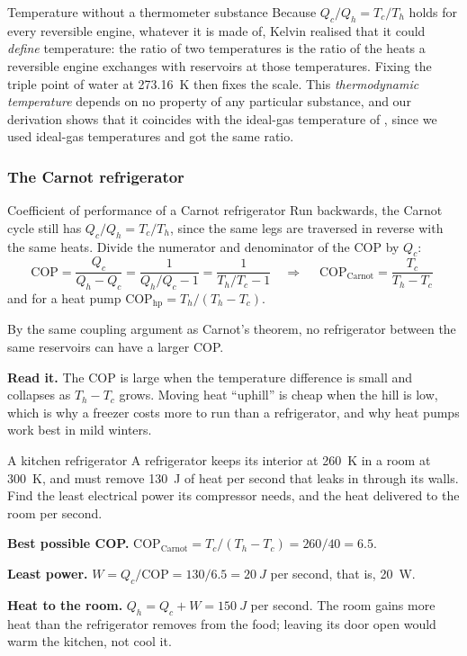 \begin{remarkbox}{Temperature without a thermometer substance}
Because $Q_c/Q_h=T_c/T_h$ holds for every reversible engine, whatever it is made of, Kelvin realised
that it could \emph{define} temperature: the ratio of two temperatures is the ratio of the heats a
reversible engine exchanges with reservoirs at those temperatures. Fixing the triple point of water at
\SI{273.16}{K} then fixes the scale. This \emph{thermodynamic temperature} depends on no property of any
particular substance, and our derivation shows that it coincides with the ideal-gas temperature of
, since we used ideal-gas temperatures and got the same ratio.
\end{remarkbox}

\subsubsection{The Carnot refrigerator}

\begin{derivbox}{Coefficient of performance of a Carnot refrigerator}\label{der:carnot-cop}
 Run backwards, the Carnot cycle still has $Q_c/Q_h=T_c/T_h$, since the same legs are traversed in
reverse with the same heats. Divide the numerator and denominator of the COP by $Q_c$:
\[
\text{COP}=\frac{Q_c}{Q_h-Q_c}=\frac{1}{Q_h/Q_c-1}=\frac{1}{T_h/T_c-1}
\quad\Longrightarrow\quad
\boxed{\;\text{COP}_{\text{Carnot}}=\frac{T_c}{T_h-T_c}\;}
\]
and for a heat pump $\text{COP}_{\text{hp}}=T_h/(T_h-T_c)$.

 By the same coupling argument as Carnot's theorem, no refrigerator between the same reservoirs
can have a larger COP.

 \textbf{Read it.} The COP is large when the temperature difference is small and collapses as
$T_h-T_c$ grows. Moving heat ``uphill'' is cheap when the hill is low, which is why a freezer costs more to
run than a refrigerator, and why heat pumps work best in mild winters.
\end{derivbox}

\begin{exbox}{A kitchen refrigerator}\label{ex:thermo-fridge}
A refrigerator keeps its interior at \SI{260}{K} in a room at \SI{300}{K}, and must remove \SI{130}{J} of
heat per second that leaks in through its walls. Find the least electrical power its compressor needs, and
the heat delivered to the room per second.

 \textbf{Best possible COP.} $\text{COP}_{\text{Carnot}}=T_c/(T_h-T_c)=260/40=6.5$.

 \textbf{Least power.} $W=Q_c/\text{COP}=130/6.5=\SI{20}{J}$ per second, that is, \SI{20}{W}.

 \textbf{Heat to the room.} $Q_h=Q_c+W=\SI{150}{J}$ per second. The room gains more heat than the
refrigerator removes from the food; leaving its door open would warm the kitchen, not cool it.
\end{exbox}

